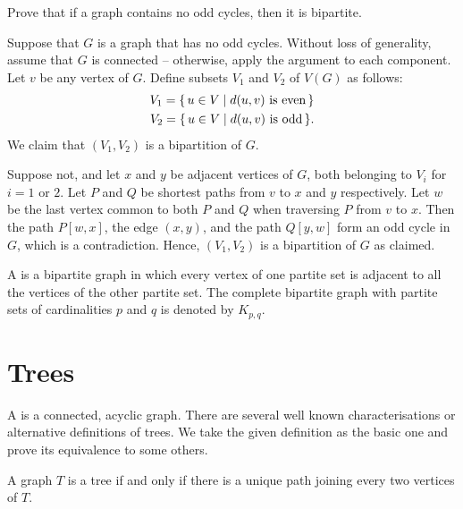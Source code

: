 \begin{DExercise}
Prove that if a graph contains no odd cycles, then it is bipartite.
\end{DExercise}

\begin{Solution*}
Suppose that $G$ is a graph that has no odd cycles. Without loss of generality, assume that $G$ is connected -- otherwise, apply the argument to each component. Let $v$ be any vertex of $G$. Define subsets $V_1$ and $V_2$ of $V(G)$ as follows:
\begin{align*}
    V_1 = \qty{\, u \in V \mid d(u, v)\ \text{is even} \,} \\
    V_2 = \qty{\, u \in V \mid d(u, v)\ \text{is odd} \,}.
\end{align*}
We claim that $(V_1, V_2)$ is a bipartition of $G$.

Suppose not, and let $x$ and $y$ be adjacent vertices of $G$, both belonging to $V_i$ for $i = 1$ or $2$. Let $P$ and $Q$ be shortest paths from $v$ to $x$ and $y$ respectively. Let $w$ be the last vertex common to both $P$ and $Q$ when traversing $P$ from $v$ to $x$. Then the path $P[w,x]$, the edge $(x, y)$, and the path $Q[y,w]$ form an odd cycle in $G$, which is a contradiction. Hence, $(V_1, V_2)$ is a bipartition of $G$ as claimed.
\end{Solution*}

A  is a bipartite graph in which every vertex of one partite set is adjacent to all the vertices of the other partite set. The complete bipartite graph with partite sets of cardinalities $p$ and $q$ is denoted by $K_{p,q}$.


\section{Trees}\label{sec:Trees}

A  is a connected, acyclic graph. There are several well known characterisations or alternative definitions of trees. We take the given definition as the basic one and prove its equivalence to some others.

\begin{Theorem}\label{thm:UniPath}
A graph $T$ is a tree if and only if there is a unique path joining every two vertices of $T$.
\end{Theorem}

